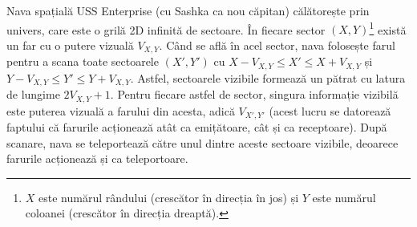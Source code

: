 \documentclass[12pt]{article}
\begin{document}
\renewcommand{\headerLang}{Română}
\renewcommand{\problemName}{AB13. Vision}

\renewcommand{\headerLeft}{IATI Day 1, Senior group}
\renewcommand{\headerRightFirst}{XVII INTERNATIONAL ADVANCED TOURNAMENT IN INFORMATICS}
\renewcommand{\headerRightSecond}{ONLINE 2026}

\renewcommand{\tl}{$5$ s}
\renewcommand{\ml}{$1024$ MB}
\problem{PROBLEMĂ \problemName}


Nava spațială USS Enterprise (cu Sashka ca nou căpitan) călătorește prin univers, care este o grilă 2D infinită de sectoare. În fiecare sector $(X, Y)$\footnote{$X$ este numărul rândului (crescător în direcția în jos) și $Y$ este numărul coloanei (crescător în direcția dreaptă).} există un far cu o putere vizuală $V_{X, Y}$. Când se află în acel sector, nava folosește farul pentru a scana toate sectoarele $(X', Y')$ cu $X - V_{X, Y} \leq X' \leq X + V_{X, Y}$ și $Y - V_{X, Y} \leq Y' \leq Y + V_{X, Y}$. Astfel, sectoarele vizibile formează un pătrat cu latura de lungime $2V_{X, Y} + 1$. Pentru fiecare astfel de sector, singura informație vizibilă este puterea vizuală a farului din acesta, adică $V_{X', Y'}$ (acest lucru se datorează faptului că farurile acționează atât ca emițătoare, cât și ca receptoare). După scanare, nava se teleportează către unul dintre aceste sectoare vizibile, deoarece farurile acționează și ca teleportoare.

\end{document}
